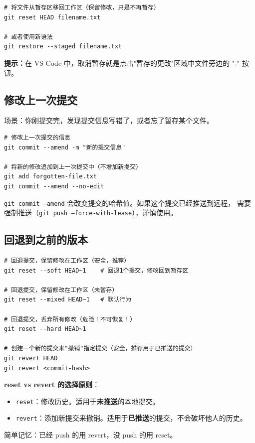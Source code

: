 \documentclass[12pt,a4paper,openany]{ctexbook}
\begin{document}
\begin{lstlisting}[style=shell]
# 将文件从暂存区移回工作区（保留修改，只是不再暂存）
git reset HEAD filename.txt

# 或者使用新语法
git restore --staged filename.txt
\end{lstlisting}

\medskip
\noindent\textbf{提示：}在 VS Code 中，取消暂存就是点击"暂存的更改"区域中文件旁边的 "-" 按钮。
\medskip

\subsection{修改上一次提交}

场景：你刚提交完，发现提交信息写错了，或者忘了暂存某个文件。

\begin{lstlisting}[style=shell]
# 修改上一次提交的信息
git commit --amend -m "新的提交信息"

# 将新的修改追加到上一次提交中（不增加新提交）
git add forgotten-file.txt
git commit --amend --no-edit
\end{lstlisting}

\begin{warnbox}
\texttt{git commit --amend} 会改变提交的哈希值。如果这个提交已经推送到远程，
需要强制推送（\texttt{git push --force-with-lease}），谨慎使用。
\end{warnbox}

\subsection{回退到之前的版本}

\begin{lstlisting}[style=shell]
# 回退提交，保留修改在工作区（安全，推荐）
git reset --soft HEAD~1    # 回退1个提交，修改回到暂存区

# 回退提交，保留修改在工作区（未暂存）
git reset --mixed HEAD~1   # 默认行为

# 回退提交，丢弃所有修改（危险！不可恢复！）
git reset --hard HEAD~1

# 创建一个新的提交来"撤销"指定提交（安全，推荐用于已推送的提交）
git revert HEAD
git revert <commit-hash>
\end{lstlisting}

\medskip
\textbf{reset vs revert 的选择原则}：
\begin{itemize}
  \item \texttt{reset}：修改历史。适用于\textbf{未推送}的本地提交。
  \item \texttt{revert}：添加新提交来撤销。适用于\textbf{已推送}的提交，不会破坏他人的历史。
\end{itemize}
简单记忆：已经 push 的用 revert，没 push 的用 reset。
\medskip
\end{document}
